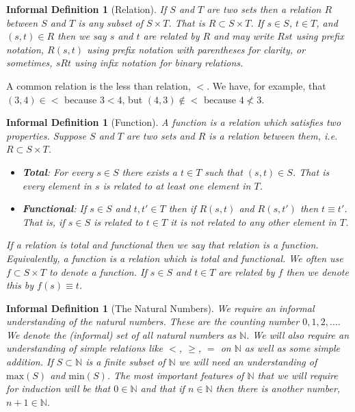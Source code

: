 \documentclass[12pt]{article}
\theoremstyle{break}
\theoremstyle{break}
\theoremstyle{break}
\theoremstyle{break}
\theoremstyle{break}
\newtheorem{informal definition}[definition]{Informal Definition}
\begin{document}
\begin{informal definition}[Relation]
If $S$ and $T$ are two sets then a relation $R$ between $S$ and $T$ is any subset of $S\times T$. That is $R\subset S\times T$.
If $s\in S$, $t\in T$, and $(s, t)\in R$ then we say $s$ and $t$ are related by $R$ and may write $Rst$ using prefix notation, $R(s, t)$ using prefix notation with parentheses for clarity, or sometimes, $sRt$ using infix notation for binary relations.
\end{informal definition}
A common relation is the less than relation, $<$.
We have, for example, that $(3, 4) \in <$ because $3<4$, but $(4,3)\not \in <$ because $4\not < 3$.

\begin{informal definition}[Function]
A function is a relation which satisfies two properties.
Suppose $S$ and $T$ are two sets and $R$ is a relation between them, i.e. $R\subset S\times T$.
\begin{itemize}
\item{\textbf{Total}: For every $s\in S$ there exists a $t\in T$ such that $(s, t) \in S$. That is every element in $s$ is related to at least one element in $T$.}
\item{\textbf{Functional}: If $s\in S$ and $t, t'\in T$ then if $R(s, t)$ and $R(s, t')$ then $t\equiv t'$. That is, if $s\in S$ is related to $t\in T$ it is not related to any other element in $T$.}
\end{itemize}
If a relation is total and functional then we say that relation is a function.
Equivalently, a function is a relation which is total and functional.
We often use $f\subset S\times T$ to denote a function.
If $s\in S$ and $t\in T$ are related by $f$ then we denote this by $f(s) \equiv t$.
\end{informal definition}

\begin{informal definition}[The Natural Numbers]


We require an informal understanding of the natural numbers.
These are the counting number $0, 1, 2, \ldots$.
We denote the (informal) set of all natural numbers as $\mathbb{N}$.
We will also require an understanding of simple relations like $<$, $\ge$, $=$ on $\mathbb{N}$ as well as some simple addition.
If $S\subset \mathbb{N}$ is a finite subset of $\mathbb{N}$ we will need an understanding of $\text{max}(S)$ and $\text{min}(S)$. The most important features of $\mathbb{N}$ that we will require for induction will be that $0\in \mathbb{N}$ and that if $n\in \mathbb{N}$ then there is another number, $n+1 \in \mathbb{N}$.
\end{informal definition}
\end{document}
